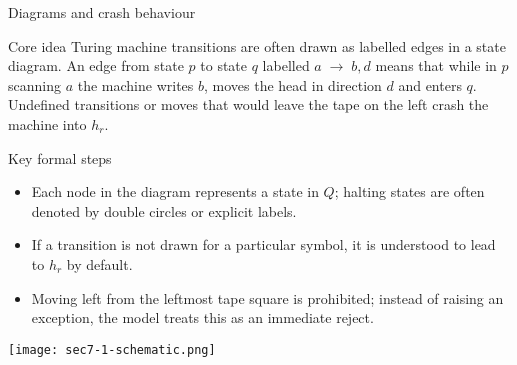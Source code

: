 \begin{frame}[t]{Diagrams and crash behaviour}
  \begin{tblock}{Core idea}
    Turing machine transitions are often drawn as labelled edges in a
    state diagram.  An edge from state $p$ to state $q$ labelled
    $a\;\rightarrow\;b,d$ means that while in $p$ scanning $a$ the machine
    writes $b$, moves the head in direction $d$ and enters $q$.
    Undefined transitions or moves that would leave the tape on the
    left crash the machine into $h_r$.
  \end{tblock}
  \begin{tblock}{Key formal steps}
    \begin{itemize}
      \item Each node in the diagram represents a state in $Q$;
        halting states are often denoted by double circles or explicit
        labels.
      \item If a transition is not drawn for a particular symbol, it is
        understood to lead to $h_r$ by default.
      \item Moving left from the leftmost tape square is prohibited;
        instead of raising an exception, the model treats this as an
        immediate reject.
    \end{itemize}
  \end{tblock}
  \centering
  \texttt{[image: sec7-1-schematic.png]} %
  \label{fr:7.1-10}
\end{frame}

